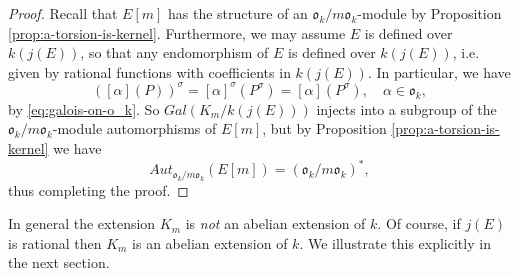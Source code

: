 \begin{proof}
  Recall that $E[m]$ has the structure of an $\mathfrak{o}_{k} / m
  \mathfrak{o}_{k}$-module by Proposition \ref{prop:a-torsion-is-kernel}.
  Furthermore, we may assume $E$ is defined over $k(j(E))$, so that any endomorphism
  of $E$ is defined over $k(j(E))$, i.e. given by rational functions with
  coefficients in $k(j(E))$.  In particular, we have
  \begin{equation*}
    ([\alpha](P))^{\sigma} = [\alpha]^{\sigma}(P^{\sigma}) = [\alpha](P^{\sigma}),
    \quad \alpha \in \mathfrak{o}_{k},
  \end{equation*}
  by \eqref{eq:galois-on-o_k}. So $Gal(K_{m}/k(j(E)))$ injects into a subgroup of the $\mathfrak{o}_{k} / m
  \mathfrak{o}_{k}$-module automorphisms of $E[m]$, but by Proposition
  \ref{prop:a-torsion-is-kernel} we have
  \begin{equation*}
    Aut_{\mathfrak{o}_{k} / m \mathfrak{o}_{k}}(E[m]) = (\mathfrak{o}_{k} / m \mathfrak{o}_{k})^{*},
  \end{equation*}
  thus completing the proof.
\end{proof}
\begin{rem}
  \label{rem:not-abelian-over-k}
  In general the extension $K_{m}$ is \emph{not} an abelian extension of $k$.  Of
  course, if $j(E)$ is rational then $K_{m}$ is an abelian extension of $k$.  We
  illustrate this explicitly in the next section.
\end{rem}

